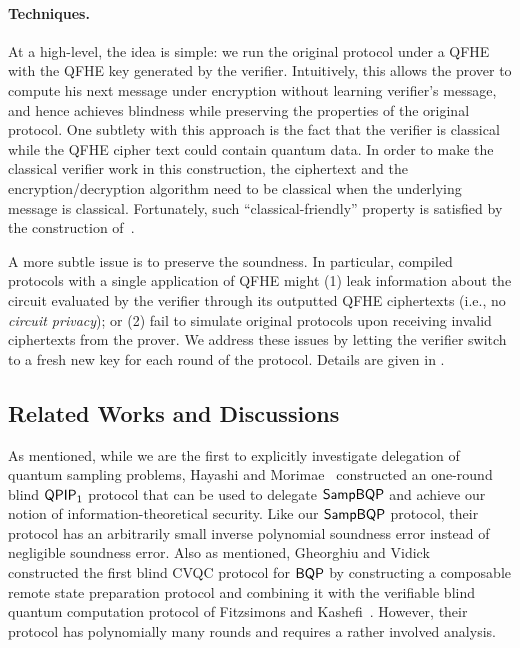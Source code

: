 \paragraph{Techniques.} At a high-level, the idea is simple: we run the original protocol under a QFHE with the QFHE key generated by the verifier. Intuitively, this allows the prover to compute his next message under encryption without learning verifier's message, and hence achieves blindness while preserving the properties of the original protocol.
One subtlety with this approach is the fact that the verifier is classical while the QFHE cipher text could contain quantum data.
In order to make the classical verifier work in this construction, the ciphertext and the encryption/decryption algorithm need to be classical when the underlying message is classical. Fortunately, such  ``classical-friendly'' property is satisfied by the construction of~\cite{mahadev_qfhe, brakerski_qfhe}.

A more subtle issue is to preserve the soundness.
In particular, compiled protocols with a single application of QFHE might (1) leak information about the circuit evaluated by the verifier through its outputted QFHE ciphertexts (i.e., no \emph{circuit privacy});
or (2) fail to simulate original protocols upon receiving invalid ciphertexts from the prover.
We address these issues by letting the verifier switch to a fresh new key for each round of the protocol. 
Details are given in .

\subsection{Related Works and Discussions}  \label{subsec:discussion}

As mentioned, while we are the first to explicitly investigate delegation of quantum sampling problems, Hayashi and Morimae~\cite{hayashi2015verifiable} constructed an one-round blind $\operatorname{\mathsf{QPIP}}_1$ protocol that can be used to delegate $\operatorname{\mathsf{SampBQP}}$ and achieve our notion of information-theoretical security. Like our $\operatorname{\mathsf{SampBQP}}$ protocol, their protocol has an arbitrarily small inverse polynomial soundness error instead of negligible soundness error. Also as mentioned,  Gheorghiu and Vidick~\cite{FOCS:GheVid19} constructed the first blind CVQC protocol for $\operatorname{\mathsf{BQP}}$ by constructing a composable remote state preparation protocol and combining it with the verifiable blind quantum computation protocol of Fitzsimons and Kashefi~\cite{FK17}. However, their protocol has polynomially many rounds  and requires a rather involved analysis. 

